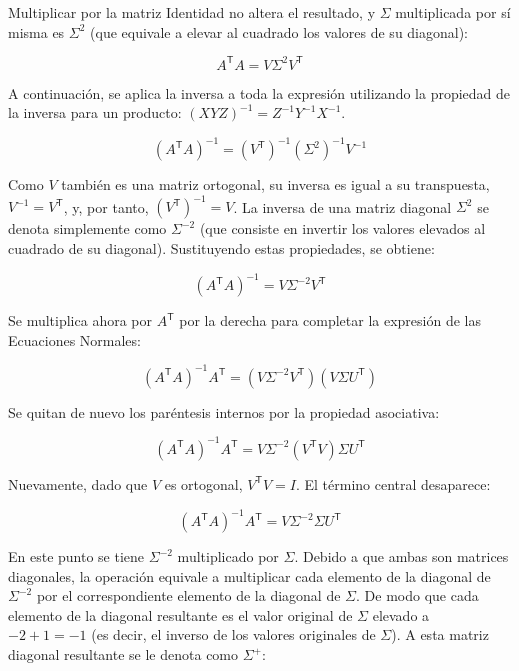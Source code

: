 \documentclass[11pt,a4paper]{article}
\newcommand{\trans}{\mathsf{T}}      %
\begin{document}
Multiplicar por la matriz Identidad no altera el resultado, y \(\Sigma\) multiplicada por sí misma es \(\Sigma^2\) (que equivale a elevar al cuadrado los valores de su diagonal):

\begin{equation}
    A^{\trans} A = V \Sigma^2 V^{\trans}
\end{equation}

A continuación, se aplica la inversa a toda la expresión utilizando la propiedad de la inversa para un producto: \((X Y Z)^{-1} = Z^{-1} Y^{-1} X^{-1}\).

\begin{equation}
    (A^{\trans} A)^{-1} = (V^{\trans})^{-1} (\Sigma^2)^{-1} V^{-1}
\end{equation}

Como \(V\) también es una matriz ortogonal, su inversa es igual a su transpuesta, \(V^{-1} = V^{\trans}\), y, por tanto, \((V^{\trans})^{-1} = V\). La inversa de una matriz diagonal \(\Sigma^2\) se denota simplemente como \(\Sigma^{-2}\) (que consiste en invertir los valores elevados al cuadrado de su diagonal). Sustituyendo estas propiedades, se obtiene:

\begin{equation}
    (A^{\trans} A)^{-1} = V \Sigma^{-2} V^{\trans}
\end{equation}

Se multiplica ahora por \(A^{\trans}\) por la derecha para completar la expresión de las Ecuaciones Normales:

\begin{equation}
    (A^{\trans} A)^{-1} A^{\trans} = (V \Sigma^{-2} V^{\trans}) (V \Sigma U^{\trans})
\end{equation}

Se quitan de nuevo los paréntesis internos por la propiedad asociativa:

\begin{equation}
    (A^{\trans} A)^{-1} A^{\trans} = V \Sigma^{-2} (V^{\trans} V) \Sigma U^{\trans}
\end{equation}

Nuevamente, dado que \(V\) es ortogonal, \(V^{\trans} V = I\). El término central desaparece:

\begin{equation}
    (A^{\trans} A)^{-1} A^{\trans} = V \Sigma^{-2} \Sigma U^{\trans}
\end{equation}

En este punto se tiene \(\Sigma^{-2}\) multiplicado por \(\Sigma\). Debido a que ambas son matrices diagonales, la operación equivale a multiplicar cada elemento de la diagonal de \(\Sigma^{-2}\) por el correspondiente elemento de la diagonal de \(\Sigma\). De modo que cada elemento de la diagonal resultante es el valor original de \(\Sigma\) elevado a \(-2 + 1 = -1\) (es decir, el inverso de los valores originales de \(\Sigma\)). A esta matriz diagonal resultante se le denota como \(\Sigma^+\):
\end{document}
